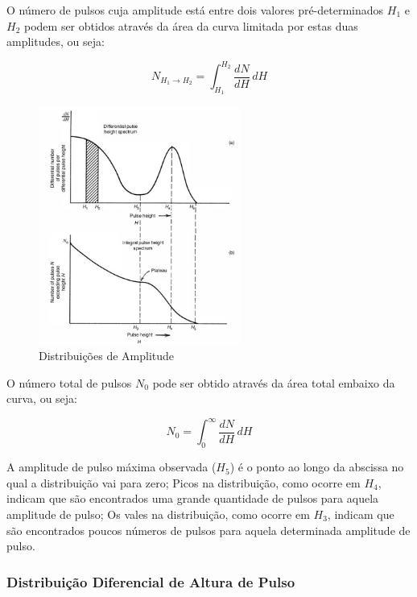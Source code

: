 \documentclass[11pt,a4paper]{article}
\begin{document}
			O número de pulsos cuja amplitude está entre dois valores pré-determinados $H_1$ e $H_2$ podem ser obtidos através da área da curva limitada por estas duas amplitudes, ou seja:

				\begin{equation}
					N_{H_1 \rightarrow  H_2} = \int_{H_1}^{H_2} \frac{dN}{dH}  \,dH 
				\end{equation}

				\begin{figure}
					\centering
					\includegraphics[width=0.59\textwidth]{Imagens/distribuicaoDeAlturaDePulso.jpg}
					\caption{Distribuições de Amplitude}
					\label{fig:distribuicaoDeAlturaDePulso}
				\end{figure}

			O número total de pulsos $N_0$ pode ser obtido através da área total embaixo da curva, ou seja:

				\begin{equation}
					N_0 = \int_{0}^{\infty} \frac{dN}{dH} \,dH
				\end{equation}

			A amplitude de pulso máxima observada ($H_5$) é o ponto ao longo da abscissa no qual a distribuição vai para zero; Picos na distribuição, como ocorre em $H_4$, indicam que são encontrados uma grande quantidade de pulsos para aquela amplitude de pulso; Os vales na distribuição, como ocorre em $H_3$, indicam que são encontrados poucos números de pulsos para aquela determinada amplitude de pulso. 

		\subsubsection*{Distribuição Diferencial de Altura de Pulso}
\end{document}
